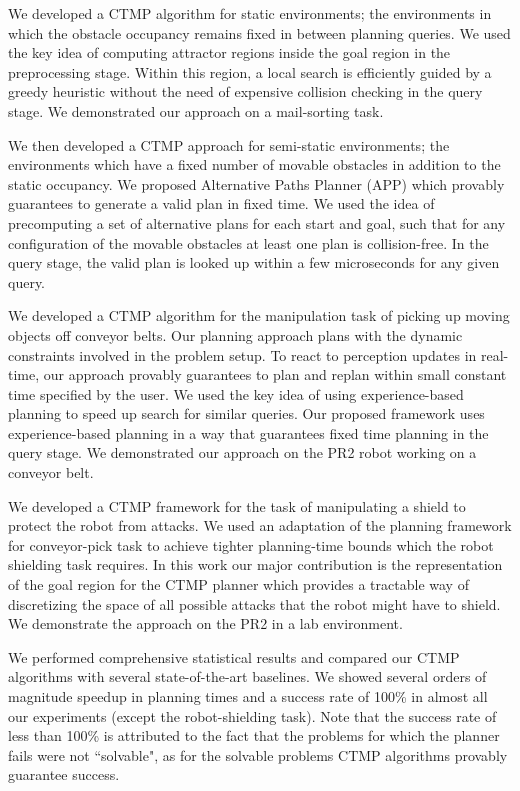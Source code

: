 \documentclass[a4paper]{report}
\begin{document}
We developed a CTMP algorithm for static environments; the environments in which the obstacle occupancy remains fixed in between planning queries. We used the key idea of computing attractor regions inside the goal region in the preprocessing stage. Within this region, a local search is efficiently guided by a greedy heuristic without the need of expensive collision checking in the query stage. We demonstrated our approach on a mail-sorting task.

We then developed a CTMP approach for semi-static environments; the environments which have a fixed number of movable obstacles in addition to the static occupancy. We proposed Alternative Paths Planner (APP) which provably guarantees to generate a valid plan in fixed time. We used the idea of precomputing a set of alternative plans for each start and goal, such that for any configuration of the movable obstacles at least one plan is collision-free. In the query stage, the valid plan is looked up within a few microseconds for any given query.

We developed a CTMP algorithm for the manipulation task of picking up moving objects off conveyor belts. Our planning approach plans with the dynamic constraints involved in the problem setup. To react to perception updates in real-time, our approach provably guarantees to plan and replan within small constant time specified by the user. We used the key idea of using experience-based planning to speed up search for similar queries. Our proposed framework uses experience-based planning in a way that guarantees fixed time planning in the query stage. We demonstrated our approach on the PR2 robot working on a conveyor belt.

We developed a CTMP framework for the task of manipulating a shield to protect the robot from attacks. We used an adaptation of the planning framework for conveyor-pick task to achieve tighter planning-time bounds which the robot shielding task requires. In this work our major contribution is the representation of the goal region for the CTMP planner which provides a tractable way of discretizing the space of all possible attacks that the robot might have to shield. We demonstrate the approach on the PR2 in a lab environment.

We performed comprehensive statistical results and compared our CTMP algorithms with several state-of-the-art baselines. We showed several orders of magnitude speedup in planning times and a success rate of 100\% in almost all our experiments (except the robot-shielding task). Note that the success rate of less than 100\% is attributed to the fact that the problems for which the planner fails were not ``solvable", as for the solvable problems CTMP algorithms provably guarantee success.
\end{document}
